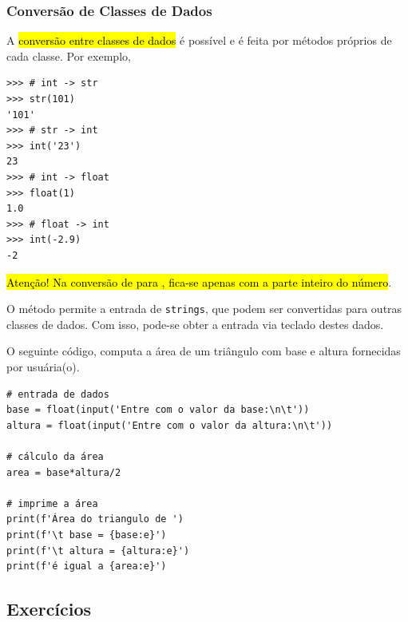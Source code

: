 \subsubsection{Conversão de Classes de Dados}

A \hl{conversão entre classes de dados} é possível e é feita por métodos próprios de cada classe. Por exemplo,

\begin{lstlisting}
>>> # int -> str
>>> str(101)
'101'
>>> # str -> int
>>> int('23')
23
>>> # int -> float
>>> float(1)
1.0
>>> # float -> int
>>> int(-2.9)
-2
\end{lstlisting}

\hl{Atenção! Na conversão de {\PYTHONfloat} para \PYTHONint, fica-se apenas com a parte inteiro do número}.

\begin{obs}
  O método {\PYTHONinput} permite a entrada de \texttt{strings}, que podem ser convertidas para outras classes de dados. Com isso, pode-se obter a entrada via teclado destes dados.
\end{obs}

\begin{ex}
  O seguinte código, computa a área de um triângulo com base e altura fornecidas por usuária(o).

\ifisbook
\vspace{0.2cm}
\fi

\begin{lstlisting}
# entrada de dados
base = float(input('Entre com o valor da base:\n\t'))
altura = float(input('Entre com o valor da altura:\n\t'))

# cálculo da área
area = base*altura/2

# imprime a área
print(f'Área do triangulo de ')
print(f'\t base = {base:e}')
print(f'\t altura = {altura:e}')
print(f'é igual a {area:e}')
\end{lstlisting}

\end{ex}

\subsection{Exercícios}

